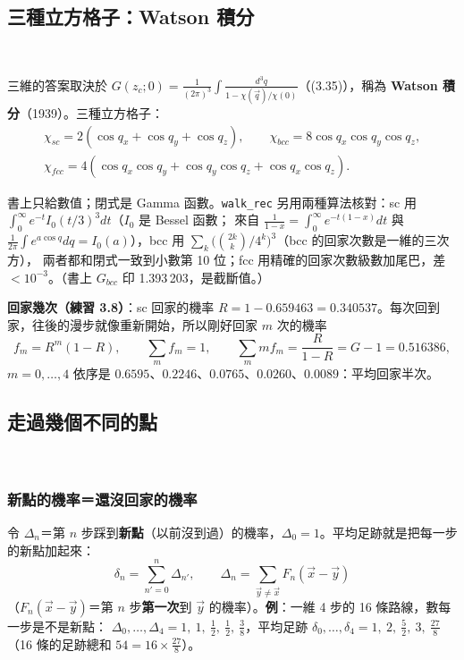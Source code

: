 \subsection{三種立方格子：Watson 積分}
\ 

三維的答案取決於 $G(z_c;0)=\frac{1}{(2\pi)^3}\int\frac{d^3q}{1-\chi(\vec q)/\chi(0)}$（(3.35)），稱為 \textbf{Watson 積分}（1939）。三種立方格子：
\begin{gather*}
\chi_{sc}=2(\cos q_x+\cos q_y+\cos q_z),\qquad \chi_{bcc}=8\cos q_x\cos q_y\cos q_z,\\
\chi_{fcc}=4(\cos q_x\cos q_y+\cos q_y\cos q_z+\cos q_x\cos q_z).\tag{3.36--3.38}
\end{gather*}
\begin{table}[H]
\centering
\ThreeTabLattices
\caption{三種立方格子的 Watson 積分（(3.39)--(3.41)）與逃脫機率。鄰居越多越容易逃走}\label{three-tab-lattices}
\end{table}
書上只給數值；閉式是 Gamma 函數。\texttt{walk\_rec} 另用兩種算法核對：sc 用 $\int_0^\infty e^{-t}I_0(t/3)^3dt$（$I_0$ 是 Bessel 函數；
來自 $\frac{1}{1-x}=\int_0^\infty e^{-t(1-x)}dt$ 與 $\frac{1}{2\pi}\int e^{a\cos q}dq=I_0(a)$），bcc 用 $\sum_k\big(\binom{2k}{k}/4^k\big)^3$（bcc 的回家次數是一維的三次方），
兩者都和閉式一致到小數第 10 位；fcc 用精確的回家次數級數加尾巴，差 $<10^{-3}$。（書上 $G_{bcc}$ 印 1.393\,203，是截斷值。）

\textbf{回家幾次（練習 3.8）}：sc 回家的機率 $R=1-0.659463=0.340537$。每次回到家，往後的漫步就像重新開始，所以剛好回家 $m$ 次的機率
\[f_m=R^m(1-R),\qquad \sum_mf_m=1,\qquad \sum_m m f_m=\frac{R}{1-R}=G-1=0.516386,\]
$m=0,\dots,4$ 依序是 $0.6595$、$0.2246$、$0.0765$、$0.0260$、$0.0089$：平均回家半次。
\begin{table}[H]
\centering
\small
\ThreeTabFm
\caption{sc：剛好回家 $m$ 次的機率。1000 步內的精確值由第一次回家的機率 $f_n$ 卷積算出；模擬是 1000 人各走 1000 步}\label{three-tab-fm}
\end{table}

\subsection{走過幾個不同的點}
\ 

\subsubsection{新點的機率＝還沒回家的機率}
令 $\Delta_n$＝第 $n$ 步踩到\textbf{新點}（以前沒到過）的機率，$\Delta_0=1$。平均足跡就是把每一步的新點加起來：
\[\delta_n=\sum_{n'=0}^{n}\Delta_{n'},\qquad \Delta_n=\sum_{\vec y\ne\vec x}F_n(\vec x-\vec y)\tag{3.42, 3.43}\]
（$F_n(\vec x-\vec y)$＝第 $n$ 步\textbf{第一次}到 $\vec y$ 的機率）。\textbf{例}：一維 4 步的 16 條路線，數每一步是不是新點：
$\Delta_0,\dots,\Delta_4=1,\ 1,\ \frac12,\ \frac12,\ \frac38$，平均足跡 $\delta_0,\dots,\delta_4=1,\ 2,\ \frac52,\ 3,\ \frac{27}8$（16 條的足跡總和 $54=16\times\frac{27}{8}$）。

